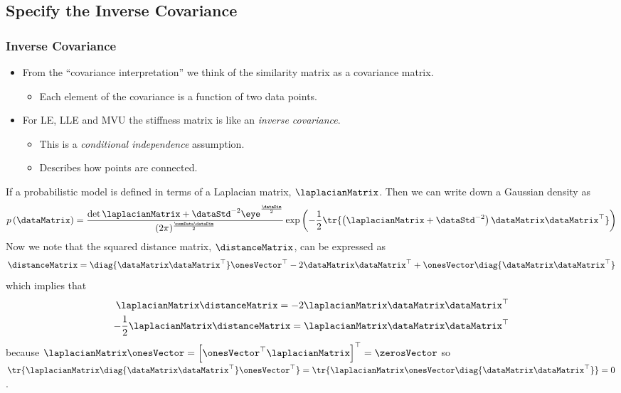 \subsection{Specify the Inverse Covariance}



\subsubsection{Inverse Covariance}
\begin{itemize}
\item From the ``covariance interpretation'' we think of the
  similarity matrix as a covariance matrix.
  \begin{itemize}
  \item Each element of the covariance is a function of two data
    points.
  \end{itemize}
\item For LE, LLE and MVU the stiffness matrix is like an \emph{inverse covariance}.
  \begin{itemize}
  \item This is a \emph{conditional independence} assumption. 
  \item Describes how points are connected.
  \end{itemize}
\end{itemize}


If a probabilistic model is defined in terms of a Laplacian matrix, $\laplacianMatrix$. Then we can write down a Gaussian density as
\[
p\left(\dataMatrix\right) = \frac{\det{\laplacianMatrix + \dataStd^{-2}\eye}^{\frac{\dataDim}{2}}}{(2\pi)^{\frac{\numData\dataDim}{2}}} \exp\left(-\frac{1}{2}\tr{\left(\laplacianMatrix + \dataStd^{-2}\right)\dataMatrix \dataMatrix^\top}\right)
\]
Now we note that the squared distance matrix, $\distanceMatrix$, can be expressed as
\[
\distanceMatrix = \diag{\dataMatrix \dataMatrix^\top} \onesVector^\top - 2\dataMatrix \dataMatrix^\top + \onesVector \diag{\dataMatrix \dataMatrix^\top}
\]
which implies that 
\begin{align*}
\laplacianMatrix \distanceMatrix = - 2\laplacianMatrix \dataMatrix \dataMatrix^\top\\
-\frac{1}{2}\laplacianMatrix \distanceMatrix = \laplacianMatrix \dataMatrix \dataMatrix^\top
\end{align*}
because $\laplacianMatrix \onesVector = \left[\onesVector^\top \laplacianMatrix\right]^\top=\zerosVector$ so $\tr{\laplacianMatrix\diag{\dataMatrix \dataMatrix^\top} \onesVector^\top} = \tr{\laplacianMatrix\onesVector \diag{\dataMatrix \dataMatrix^\top}} = 0$.

